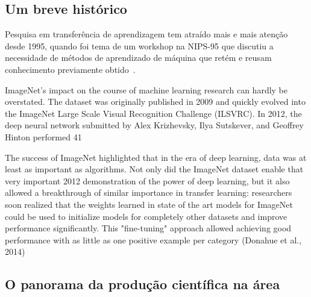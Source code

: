 \documentclass[sigconf]{acmart}
\begin{document}
  \subsection{Um breve histórico}
  Pesquisa em transferência de aprendizagem tem atraído mais e mais atenção desde 1995, quando foi tema de  um workshop na NIPS-95 que discutiu a necessidade de métodos de aprendizado de máquina que retém e reusam conhecimento previamente obtido~\cite{PanYang}. 
  
  ImageNet’s impact on the course of machine learning research can hardly be overstated. The dataset was originally published in 2009 and quickly evolved into the ImageNet Large Scale Visual Recognition Challenge (ILSVRC). In 2012, the deep neural network submitted by Alex Krizhevsky, Ilya Sutskever, and Geoffrey Hinton performed 41%

The success of ImageNet highlighted that in the era of deep learning, data was at least as important as algorithms. Not only did the ImageNet dataset enable that very important 2012 demonstration of the power of deep learning, but it also allowed a breakthrough of similar importance in transfer learning: researchers soon realized that the weights learned in state of the art models for ImageNet could be used to initialize models for completely other datasets and improve performance significantly. This "fine-tuning" approach allowed achieving good performance with as little as one positive example per category (Donahue et al., 2014)

  \subsection{O panorama da produção científica na área}\label{sec:panorama}
 
  \lipsum[1]
  
  

 
\end{document}
